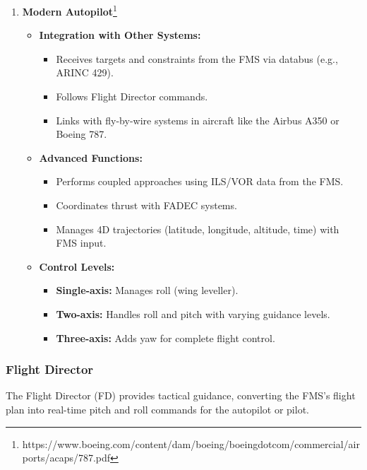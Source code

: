 \documentclass[math,code]{amznotes}
\theoremstyle{remark}
\begin{document}
\begin{enumerate}
    \item \textbf{Modern Autopilot}\footnote{https://www.boeing.com/content/dam/boeing/boeingdotcom/commercial/airports/acaps/787.pdf}
    \begin{itemize}
        \item \textbf{Integration with Other Systems:}
        \begin{itemize}
            \item Receives targets and constraints from the FMS via databus (e.g., ARINC 429).
            \item Follows Flight Director commands.
            \item Links with fly-by-wire systems in aircraft like the Airbus A350 or Boeing 787.
        \end{itemize}
        \item \textbf{Advanced Functions:}
        \begin{itemize}
            \item Performs coupled approaches using ILS/VOR data from the FMS.
            \item Coordinates thrust with FADEC systems.
            \item Manages 4D trajectories (latitude, longitude, altitude, time) with FMS input.
        \end{itemize}
        \item \textbf{Control Levels:}
        \begin{itemize}
            \item \textbf{Single-axis:} Manages roll (wing leveller).
            \item \textbf{Two-axis:} Handles roll and pitch with varying guidance levels.
            \item \textbf{Three-axis:} Adds yaw for complete flight control.
        \end{itemize}
    \end{itemize}
\end{enumerate}

\subsubsection{Flight Director}
The Flight Director (FD) provides tactical guidance, converting the FMS’s flight plan into real-time pitch and roll commands for the autopilot or pilot.
\end{document}
